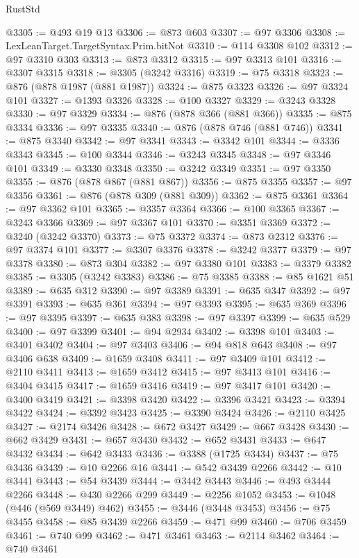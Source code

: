 \begin{lexlean}{RustStd}
\begin{coremodule}
@3305 := @493 @19 @13
@3306 := @873 @603
@3307 := @97 @3306
@3308 := LexLeanTarget.TargetSyntax.Prim.bitNot
@3310 := @114 @3308 @102
@3312 := @97 @3310 @303
@3313 := @873 @3312
@3315 := @97 @3313 @101
@3316 := @3307 @3315
@3318 := @3305 (@3242 @3316)
@3319 := @75 @3318
@3323 := @876 (@878 @1987 (@881 @1987))
@3324 := @875 @3323
@3326 := @97 @3324 @101
@3327 := @1393 @3326
@3328 := @100 @3327
@3329 := @3243 @3328
@3330 := @97 @3329
@3334 := @876 (@878 @366 (@881 @366))
@3335 := @875 @3334
@3336 := @97 @3335
@3340 := @876 (@878 @746 (@881 @746))
@3341 := @875 @3340
@3342 := @97 @3341
@3343 := @3342 @101
@3344 := @3336 @3343
@3345 := @100 @3344
@3346 := @3243 @3345
@3348 := @97 @3346 @101
@3349 := @3330 @3348
@3350 := @3242 @3349
@3351 := @97 @3350
@3355 := @876 (@878 @867 (@881 @867))
@3356 := @875 @3355
@3357 := @97 @3356
@3361 := @876 (@878 @309 (@881 @309))
@3362 := @875 @3361
@3364 := @97 @3362 @101
@3365 := @3357 @3364
@3366 := @100 @3365
@3367 := @3243 @3366
@3369 := @97 @3367 @101
@3370 := @3351 @3369
@3372 := @3240 (@3242 @3370)
@3373 := @75 @3372
@3374 := @873 @2312
@3376 := @97 @3374 @101
@3377 := @3307 @3376
@3378 := @3242 @3377
@3379 := @97 @3378
@3380 := @873 @304
@3382 := @97 @3380 @101
@3383 := @3379 @3382
@3385 := @3305 (@3242 @3383)
@3386 := @75 @3385
@3388 := @85 @1621 @51
@3389 := @635 @312
@3390 := @97 @3389
@3391 := @635 @347
@3392 := @97 @3391
@3393 := @635 @361
@3394 := @97 @3393
@3395 := @635 @369
@3396 := @97 @3395
@3397 := @635 @383
@3398 := @97 @3397
@3399 := @635 @529
@3400 := @97 @3399
@3401 := @94 @2934
@3402 := @3398 @101
@3403 := @3401 @3402
@3404 := @97 @3403
@3406 := @94 @818 @643
@3408 := @97 @3406 @638
@3409 := @1659 @3408
@3411 := @97 @3409 @101
@3412 := @2110 @3411
@3413 := @1659 @3412
@3415 := @97 @3413 @101
@3416 := @3404 @3415
@3417 := @1659 @3416
@3419 := @97 @3417 @101
@3420 := @3400 @3419
@3421 := @3398 @3420
@3422 := @3396 @3421
@3423 := @3394 @3422
@3424 := @3392 @3423
@3425 := @3390 @3424
@3426 := @2110 @3425
@3427 := @2174 @3426
@3428 := @672 @3427
@3429 := @667 @3428
@3430 := @662 @3429
@3431 := @657 @3430
@3432 := @652 @3431
@3433 := @647 @3432
@3434 := @642 @3433
@3436 := @3388 (@1725 @3434)
@3437 := @75 @3436
@3439 := @10 @2266 @16
@3441 := @542 @3439 @2266
@3442 := @10 @3441
@3443 := @54 @3439
@3444 := @3442 @3443
@3446 := @493 @3444 @2266
@3448 := @430 @2266 @299
@3449 := @2256 @1052
@3453 := @1048 (@446 (@569 @3449) @462)
@3455 := @3446 (@3448 @3453)
@3456 := @75 @3455
@3458 := @85 @3439 @2266
@3459 := @471 @99
@3460 := @706 @3459
@3461 := @740 @99
@3462 := @471 @3461
@3463 := @2114 @3462
@3464 := @740 @3461

\end{coremodule}
\end{lexlean}
